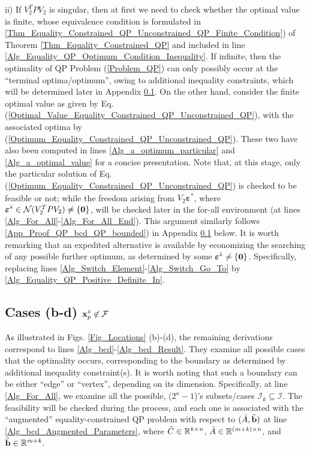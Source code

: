 \documentclass{imaman}
\newcommand{\bfb}{{\bf b}}
\newcommand{\bfx}{{\bf x}}
\newcommand{\bfvarepsilon}{{\boldsymbol \varepsilon}}
\newcommand{\bfzero}{{\bf 0}}
\newcommand{\real}{\mathbb{R}}
\newcommand{\calF}{{\mathcal F}}
\newcommand{\calI}{{\mathcal I}}
\newcommand{\calN}{{\mathcal N}}
\newcommand{\itk}{{\it k}}
\newcommand{\itm}{{\it m}}
\newcommand{\itn}{{\it n}}
\numberwithin{equation}{section}
\begin{document}
\noindent ii) If $V_2^TPV_2$ is singular, then at first we need to check whether the optimal value is finite, whose equivalence condition is formulated in \ref{Thm_Equality_Constrained_QP_Unconstrained_QP_Finite_Condition}) of Theorem \ref{Thm_Equality_Constrained_QP} and included in line \ref{Alg_Equality_QP_Optimum_Condition_Inequality}. If infinite, then the optimality of QP Problem (\ref{Problem_QP}) can only possibly occur at the ``terminal optima/optimum'', owing to additional inequality constraints, which will be determined later in Appendix \ref{App_Proof_QP_bcd}. On the other hand, consider the finite optimal value as given by Eq. (\ref{Optimal_Value_Equality_Constrained_QP_Unconstrained_QP}), with the associated optima by (\ref{Optimum_Equality_Constrained_QP_Unconstrained_QP}). These two have also been computed in lines \ref{Alg_a_optimum_particular} and \ref{Alg_a_optimal_value} for a concise presentation. Note that, at this stage, only the particular solution of Eq. (\ref{Optimum_Equality_Constrained_QP_Unconstrained_QP}) is checked to be feasible or not; while the freedom arising from $V_2\bfvarepsilon^{\bar *}$, where $\bfvarepsilon^{\bar *}\in\calN(V_2^TPV_2)\ne\{\bfzero\}$, will be checked later in the for-all environment (at lines \ref{Alg_For_All}-\ref{Alg_For_All_End}). This argument similarly follows \ref{App_Proof_QP_bcd_QP_bounded}) in Appendix \ref{App_Proof_QP_bcd} below. It is worth remarking that an expedited alternative is available by economizing the searching of any possible further optimum, as determined by some $\bfvarepsilon^{\bar *}\ne\{\bfzero\}$. Specifically, replacing lines \ref{Alg_Switch_Element}-\ref{Alg_Switch_Go_To} by \ref{Alg_Equality_QP_Positive_Definite_In}.

\subsection{Cases (b-d) $\bfx_p^{\bar *}\not\in\calF$}
\label{App_Proof_QP_bcd}
As illustrated in Figs. \ref{Fig_Locations} (b)-(d), the remaining derivations correspond to lines \ref{Alg_bcd}-\ref{Alg_bcd_Result}. They examine all possible cases that the optimality occurs, corresponding to the boundary as determined by additional inequality constraint(s). It is worth noting that such a boundary can be either ``edge'' or ``vertex'', depending on its dimension. Specifically, at line \ref{Alg_For_All}, we examine all the possible, ($2^\kappa-1$)'s subsets/cases $\calI_k\subseteq\calI$. The feasibility will be checked during the process, and each one is associated with the ``augmented'' equality-constrained QP problem with respect to $(\tilde A,\tilde\bfb)$ at line \ref{Alg_bcd_Augmented_Parameters}, where $\tilde C\in\real^{\itk\times\itn}$, $\tilde A\in\real^{(\itm+\itk)\times\itn}$, and $\tilde\bfb\in\real^{\itm+\itk}$.
\end{document}
